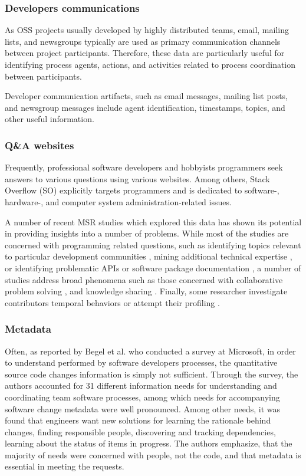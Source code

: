 \subsubsection{Developers communications}
As OSS projects usually developed by highly distributed teams, email, mailing lists, and newsgroups typically are 
used as primary communication channels between project participants. Therefore, these data are particularly useful for
identifying process agents, actions,  and activities related to process coordination between participants. 

Developer communication artifacts, such as email messages, mailing list posts, and newsgroup messages include agent identification, 
timestamps, topics, and other useful information. 

\subsubsection{Q\&A websites}
Frequently, professional software developers and hobbyists programmers seek answers to various questions using various websites. 
Among others, Stack Overﬂow (SO) explicitly targets programmers and is dedicated to software-, hardware-, and computer system 
administration-related issues.

A number of recent MSR studies which explored this data has shown its potential in providing insights into a number of problems.
While most of the studies are concerned with programming related questions, such as identifying topics relevant to particular 
development communities \cite{kartik:msr14}, mining additional technical expertise \cite{VenkataramaniGAMB13} \cite{SaxeMG13}, 
or identifying problematic APIs \cite{KavalerPGCDF13} \cite{Linares2013Exploratory} or software package documentation 
\cite{Campbell2013Deficient}, 
a number of studies address broad phenomena such as those concerned with collaborative problem solving 
\cite{Tausczik2014Collaborative}, and knowledge sharing \cite{VasilescuCSCW14} \cite{Schenk2013Geo}. 
Finally, some researcher investigate contributors temporal behaviors \cite{Bosu2013Building} or attempt their profiling 
\cite{GinscaP13}.

\subsubsection{Metadata}
Often, as reported by Begel
et al. \cite{citeulike:7260421} who conducted a survey at Microsoft, in order to understand performed 
by software developers processes, the quantitative source code changes information is simply not sufficient. Through the survey,
the authors accounted for 31 different information needs for understanding and coordinating team software processes, among 
which needs for accompanying software change metadata were well pronounced. Among other needs, it was found that engineers 
want new solutions for
learning the rationale behind
changes, finding responsible people, discovering and tracking dependencies, 
learning
about the status of items in progress. The authors emphasize, that the majority of needs were concerned with people, not 
the code, and that metadata is essential in meeting the requests.

